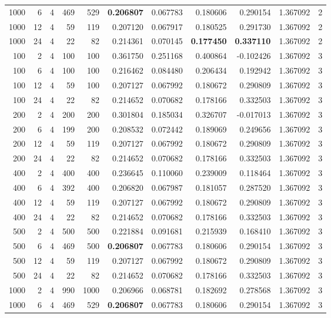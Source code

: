 \begin{table}
\begin{tabular}{rrrrrrrrrrr}
1000 & 6 & 4 & 469 & 529 & \textbf{0.206807} & 0.067783 & 0.180606 & 0.290154 & 1.367092 & 2 \\
1000 & 12 & 4 & 59 & 119 & 0.207120 & 0.067917 & 0.180525 & 0.291730 & 1.367092 & 2 \\
1000 & 24 & 4 & 22 & 82 & 0.214361 & 0.070145 & \textbf{0.177450} & \textbf{0.337110} & 1.367092 & 2 \\
100 & 2 & 4 & 100 & 100 & 0.361750 & 0.251168 & 0.400864 & -0.102426 & 1.367092 & 3 \\
100 & 6 & 4 & 100 & 100 & 0.216462 & 0.084480 & 0.206434 & 0.192942 & 1.367092 & 3 \\
100 & 12 & 4 & 59 & 100 & 0.207127 & 0.067992 & 0.180672 & 0.290809 & 1.367092 & 3 \\
100 & 24 & 4 & 22 & 82 & 0.214652 & 0.070682 & 0.178166 & 0.332503 & 1.367092 & 3 \\
200 & 2 & 4 & 200 & 200 & 0.301804 & 0.185034 & 0.326707 & -0.017013 & 1.367092 & 3 \\
200 & 6 & 4 & 199 & 200 & 0.208532 & 0.072442 & 0.189069 & 0.249656 & 1.367092 & 3 \\
200 & 12 & 4 & 59 & 119 & 0.207127 & 0.067992 & 0.180672 & 0.290809 & 1.367092 & 3 \\
200 & 24 & 4 & 22 & 82 & 0.214652 & 0.070682 & 0.178166 & 0.332503 & 1.367092 & 3 \\
400 & 2 & 4 & 400 & 400 & 0.236645 & 0.110060 & 0.239009 & 0.118464 & 1.367092 & 3 \\
400 & 6 & 4 & 392 & 400 & 0.206820 & 0.067987 & 0.181057 & 0.287520 & 1.367092 & 3 \\
400 & 12 & 4 & 59 & 119 & 0.207127 & 0.067992 & 0.180672 & 0.290809 & 1.367092 & 3 \\
400 & 24 & 4 & 22 & 82 & 0.214652 & 0.070682 & 0.178166 & 0.332503 & 1.367092 & 3 \\
500 & 2 & 4 & 500 & 500 & 0.221884 & 0.091681 & 0.215939 & 0.168410 & 1.367092 & 3 \\
500 & 6 & 4 & 469 & 500 & \textbf{0.206807} & 0.067783 & 0.180606 & 0.290154 & 1.367092 & 3 \\
500 & 12 & 4 & 59 & 119 & 0.207127 & 0.067992 & 0.180672 & 0.290809 & 1.367092 & 3 \\
500 & 24 & 4 & 22 & 82 & 0.214652 & 0.070682 & 0.178166 & 0.332503 & 1.367092 & 3 \\
1000 & 2 & 4 & 990 & 1000 & 0.206966 & 0.068781 & 0.182692 & 0.278568 & 1.367092 & 3 \\
1000 & 6 & 4 & 469 & 529 & \textbf{0.206807} & 0.067783 & 0.180606 & 0.290154 & 1.367092 & 3 \\

\end{tabular}
\end{table}
